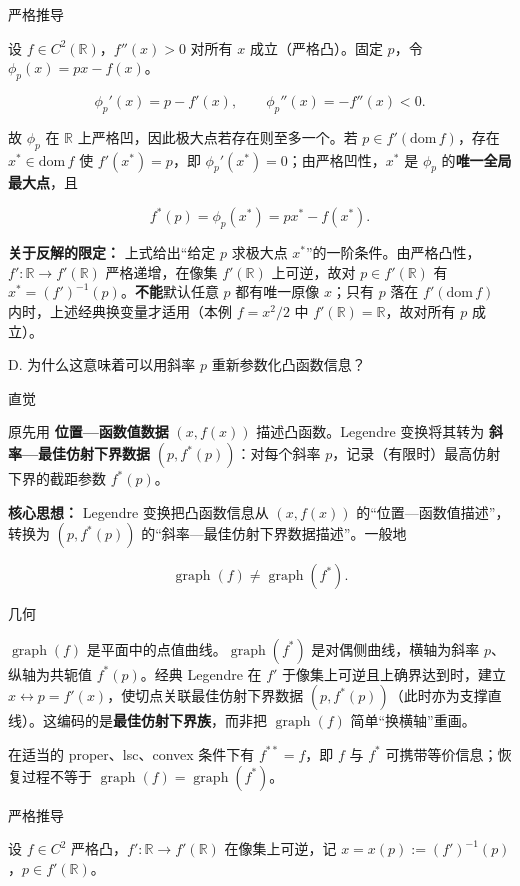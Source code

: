 \documentclass[
    lang=cn,
    color=blue,
    mode=fancy,
    thmcnt=section,
    scheme=chinese
]{elegantbook}
\begin{document}
严格推导

设 $f \in C^2(\mathbb{R})$，$f''(x) > 0$ 对所有 $x$ 成立（严格凸）。固定 $p$，令 $\phi_p(x) = px - f(x)$。

\[
\phi_p'(x) = p - f'(x), \qquad \phi_p''(x) = -f''(x) < 0.
\]

故 $\phi_p$ 在 $\mathbb{R}$ 上严格凹，因此极大点若存在则至多一个。若 $p \in f'(\mathrm{dom}\, f)$，存在 $x^* \in \mathrm{dom}\, f$ 使 $f'(x^*) = p$，即 $\phi_p'(x^*) = 0$；由严格凹性，$x^*$ 是 $\phi_p$ 的\textbf{唯一全局最大点}，且

\[
f^*(p) = \phi_p(x^*) = p x^* - f(x^*).
\]

\textbf{关于反解的限定：} 上式给出“给定 $p$ 求极大点 $x^*$”的一阶条件。由严格凸性，$f' : \mathbb{R} \to f'(\mathbb{R})$ 严格递增，在像集 $f'(\mathbb{R})$ 上可逆，故对 $p \in f'(\mathbb{R})$ 有 $x^* = (f')^{-1}(p)$。\textbf{不能}默认任意 $p$ 都有唯一原像 $x$；只有 $p$ 落在 $f'(\mathrm{dom}\, f)$ 内时，上述经典换变量才适用（本例 $f=x^2/2$ 中 $f'(\mathbb{R})=\mathbb{R}$，故对所有 $p$ 成立）。

\par
D. 为什么这意味着可以用斜率 $p$ 重新参数化凸函数信息？

直觉

原先用 \textbf{位置—函数值数据} $(x, f(x))$ 描述凸函数。Legendre 变换将其转为 \textbf{斜率—最佳仿射下界数据} $(p, f^*(p))$：对每个斜率 $p$，记录（有限时）最高仿射下界的截距参数 $f^*(p)$。

\textbf{核心思想：} Legendre 变换把凸函数信息从 $(x,f(x))$ 的“位置—函数值描述”，转换为 $(p,f^*(p))$ 的“斜率—最佳仿射下界数据描述”。一般地

\[
\operatorname{graph}(f) \neq \operatorname{graph}(f^*).
\]

几何

$\operatorname{graph}(f)$ 是平面中的点值曲线。$\operatorname{graph}(f^*)$ 是对偶侧曲线，横轴为斜率 $p$、纵轴为共轭值 $f^*(p)$。经典 Legendre 在 $f'$ 于像集上可逆且上确界达到时，建立 $x \leftrightarrow p = f'(x)$，使切点关联最佳仿射下界数据 $(p, f^*(p))$（此时亦为支撑直线）。这编码的是\textbf{最佳仿射下界族}，而非把 $\operatorname{graph}(f)$ 简单“换横轴”重画。

在适当的 proper、lsc、convex 条件下有 $f^{**}=f$，即 $f$ 与 $f^*$ 可携带等价信息；恢复过程不等于 $\operatorname{graph}(f)=\operatorname{graph}(f^*)$。

严格推导

设 $f \in C^2$ 严格凸，$f' : \mathbb{R} \to f'(\mathbb{R})$ 在像集上可逆，记 $x = x(p) := (f')^{-1}(p)$，$p \in f'(\mathbb{R})$。
\end{document}
